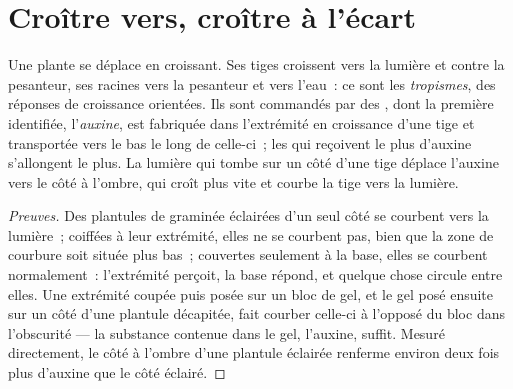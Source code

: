 \section{Croître vers, croître à l'écart}

\begin{proposition}\label{prop:g12:plant-rooted-life:tropisms}
Une plante se déplace en croissant. Ses tiges croissent vers la
lumière et contre la pesanteur, ses racines vers la pesanteur et vers
l'eau~: ce sont les \emph{tropismes}, des réponses de
croissance orientées. Ils sont commandés par des , dont la
première identifiée, l'\emph{auxine}, est fabriquée dans l'extrémité
en croissance d'une tige et transportée vers le bas le long de
celle-ci~; les  qui reçoivent le plus d'auxine s'allongent le
plus. La lumière qui tombe sur un côté d'une tige déplace l'auxine
vers le côté à l'ombre, qui croît plus vite et courbe la tige vers la
lumière.
\end{proposition}
\begin{proof}[Preuves]
Des plantules de graminée éclairées d'un seul côté se courbent vers la
lumière~; coiffées à leur extrémité, elles ne se courbent pas, bien
que la zone de courbure soit située plus bas~; couvertes seulement à
la base, elles se courbent normalement~: l'extrémité perçoit, la base
répond, et quelque chose circule entre elles. Une extrémité coupée
puis posée sur un bloc de gel, et le gel posé ensuite sur un côté
d'une plantule décapitée, fait courber celle-ci à l'opposé du bloc
dans l'obscurité --- la substance contenue dans le gel, l'auxine,
suffit. Mesuré directement, le côté à l'ombre d'une plantule éclairée
renferme environ deux fois plus d'auxine que le côté éclairé.
\end{proof}


